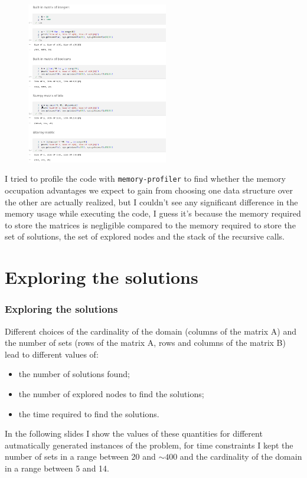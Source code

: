 \documentclass{beamer}
\begin{document}
\begin{frame}
        \begin{figure}
            \centering
            \includegraphics[width=0.55\textwidth]{mem_matrix.png}
            \label{fig:mem_matrix}
        \end{figure}
\end{frame}

\begin{frame}
    I tried to profile the code with \texttt{memory-profiler} 
    to find whether the memory occupation
    advantages
    we expect to gain from choosing one data structure over the other
    are actually realized, but I couldn't see any significant difference
    in the memory usage while executing the code, I guess it's because
    the memory required to store the matrices is negligible compared
    to the memory required to store the set of solutions, the set of explored nodes
    and the stack of the recursive calls.
\end{frame}

\section*{Exploring the solutions}

\begin{frame}
    \frametitle{Exploring the solutions}
    Different choices of the cardinality of the domain (columns of the matrix A) and
    the number of sets (rows of the matrix A, rows and columns of the matrix B) 
    lead to different values of:
    \begin{itemize}
        \item the number of solutions found;
        \item the number of explored nodes to find the solutions;
        \item the time required to find the solutions.
    \end{itemize}
    In the following slides I show the values of these quantities for different
    autmatically generated instances of the problem, for time constraints I kept the 
    number of sets in a range between 20 and $\sim400$ and the cardinality of the domain
    in a range between 5 and 14.
\end{frame}
\end{document}
